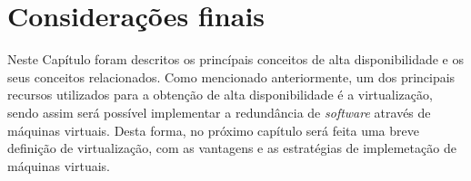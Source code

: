 \section{Considerações finais}

Neste Capítulo foram descritos os princípais conceitos de alta disponibilidade e os seus conceitos relacionados. Como mencionado anteriormente, 
um dos principais recursos utilizados para a obtenção de alta disponibilidade é a virtualização, sendo assim será possível implementar a 
redundância de \textit{software} através de máquinas virtuais. Desta forma, no próximo capítulo será feita uma breve definição de virtualização, 
com as vantagens e as estratégias de implemetação de máquinas virtuais.
